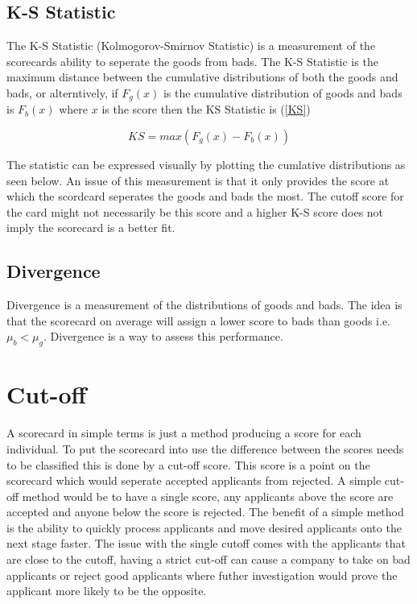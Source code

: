 \subsection{K-S Statistic}

The K-S Statistic (Kolmogorov-Smirnov Statistic) is a measurement of the scorecards ability to seperate the goods from bads. The K-S Statistic is the maximum distance between the cumulative distributions of both the goods and bads, or alterntively, if $F_{g}(x)$ is the cumulative distribution of goods and bads is $F_{b}(x)$ where $x$ is the score then the KS Statistic is (\ref{KS})

\begin{equation}\label{KS}
KS = max(F_{g}(x) - F_{b}(x))
\end{equation}

The statistic can be expressed visually by plotting the cumlative distributions as seen below. An issue of this measurement is that it only provides the score at which the scordcard seperates the goods and bads the most. The cutoff score for the card might not necessarily be this score and a higher K-S score does not imply the scorecard is a better fit. 

\subsection{Divergence}

Divergence is a measurement of the distributions of goods and bads. The idea is that the scorecard on average will assign a lower score to bads than goods i.e. $\mu_{b} < \mu_{g}$. Divergence is a way to assess this performance. 

\section{Cut-off}
A scorecard in simple terms is just a method producing a score for each individual. To put the scorecard into use the difference between the scores needs to be classified this is done by a cut-off score. This score is a point on the scorecard which would seperate accepted applicants from rejected. A simple cut-off method would be to have a single score, any applicants above the score are accepted and anyone below the score is rejected. The benefit of a simple method is the ability to quickly process applicants and move desired applicants onto the next stage faster. The issue with the single cutoff comes with the applicants that are close to the cutoff, having a strict cut-off can cause a company to take on bad applicants or reject good applicants where futher investigation would prove the applicant more likely to be the opposite. \\

